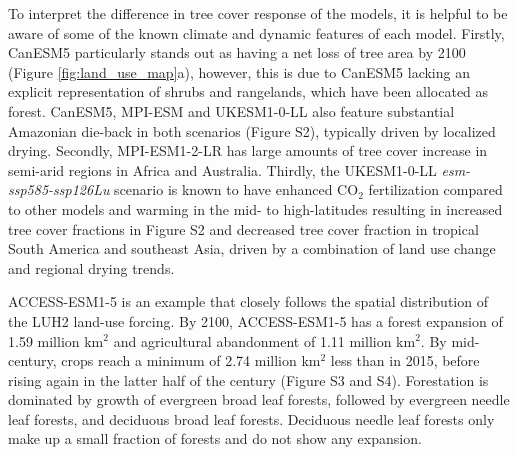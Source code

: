 \documentclass[draft]{agujournal2019}
\begin{document}
To interpret the difference in tree cover response of the models, it is helpful to be aware of some of the known climate and dynamic features of each model.
Firstly, CanESM5 particularly stands out as having a net loss of tree area by 2100 (Figure \ref{fig:land_use_map}a), however, this is due to CanESM5 lacking an explicit representation of shrubs and rangelands, which have been allocated as forest.
 CanESM5, MPI-ESM and UKESM1-0-LL also feature substantial Amazonian die-back in both scenarios (Figure S2), typically driven by localized drying.
Secondly, MPI-ESM1-2-LR has large amounts of tree cover increase in semi-arid regions in Africa and Australia.
Thirdly, the UKESM1-0-LL \textit{esm-ssp585-ssp126Lu} scenario is known to have enhanced CO$_2$ fertilization compared to other models and warming in the mid- to high-latitudes resulting in increased tree cover fractions in Figure S2 and decreased tree cover fraction in tropical South America and southeast Asia, driven by a combination of land use change and regional drying trends.

ACCESS-ESM1-5 is an example that closely follows the spatial distribution of the LUH2 land-use forcing.
By 2100, ACCESS-ESM1-5 has a forest expansion of 1.59 million km$^2$ and agricultural abandonment of 1.11 million km$^2$.
By mid-century, crops reach a minimum of 2.74 million km$^2$ less than in 2015, before rising again in the latter half of the century (Figure S3 and S4).
Forestation is dominated by growth of evergreen broad leaf forests, followed by evergreen needle leaf forests, and deciduous broad leaf forests.
Deciduous needle leaf forests only make up a small fraction of forests and do not show any expansion.
\end{document}
